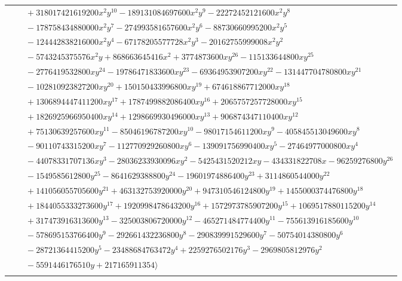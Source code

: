 \documentclass[11pt]{article}
\begin{document}
\begin{longtable}{@{}ll@{}}
 & $\quad +318017421619200x^{2}y^{10}-189131084697600x^{2}y^{9}-22272452121600x^{2}y^{8}$\\
 & $\quad -178758434880000x^{2}y^{7}-274993581657600x^{2}y^{6}-88730660995200x^{2}y^{5}$\\
 & $\quad -124442838216000x^{2}y^{4}-67178205577728x^{2}y^{3}-20162755999008x^{2}y^{2}$\\
 & $\quad -5743245375576x^{2}y+868663645416x^{2}+3774873600xy^{26}-115133644800xy^{25}$\\
 & $\quad -2776419532800xy^{24}-19786471833600xy^{23}-69364953907200xy^{22}-131447704780800xy^{21}$\\
 & $\quad -102810923827200xy^{20}+150150433996800xy^{19}+674618867712000xy^{18}$\\
 & $\quad +1306894447411200xy^{17}+1787499882086400xy^{16}+2065757257728000xy^{15}$\\
 & $\quad +1826925966950400xy^{14}+1298669930496000xy^{13}+906874347110400xy^{12}$\\
 & $\quad +75130639257600xy^{11}-85046196787200xy^{10}-98017154611200xy^{9}-405845513049600xy^{8}$\\
 & $\quad -90110743315200xy^{7}-112770929260800xy^{6}-139091756990400xy^{5}-27464977000800xy^{4}$\\
 & $\quad -44078331707136xy^{3}-28036233930096xy^{2}-5425431520212xy-434331822708x-96259276800y^{26}$\\
 & $\quad -1549585612800y^{25}-8641629388800y^{24}-19601974886400y^{23}+3114860544000y^{22}$\\
 & $\quad +141056055705600y^{21}+463132753920000y^{20}+947310546124800y^{19}+1455000374476800y^{18}$\\
 & $\quad +1844055333273600y^{17}+1920998478643200y^{16}+1572973785907200y^{15}+1069517880115200y^{14}$\\
 & $\quad +317473916313600y^{13}-325003806720000y^{12}-465271484774400y^{11}-755613916185600y^{10}$\\
 & $\quad -578695153766400y^{9}-292661432236800y^{8}-290839991529600y^{7}-50754014380800y^{6}$\\
 & $\quad -28721364415200y^{5}-23488684763472y^{4}+2259276502176y^{3}-2969805812976y^{2}$\\
 & $\quad -5591446176510y+217165911354\rangle$\\
\addlinespace[2pt]
\multicolumn{2}{@{}p{0.97\textwidth}@{}}{$i=11$, $D_i=16$, $\rho_{ij}$: $15{:}2, \allowbreak 20{:}2, \allowbreak 22{:}2, \allowbreak 24{:}2, \allowbreak 30{:}2, \allowbreak 31{:}1, \allowbreak 34{:}1, \allowbreak 42{:}1, \allowbreak 43{:}2, \allowbreak 44{:}2$}\\

\end{longtable}
\end{document}
